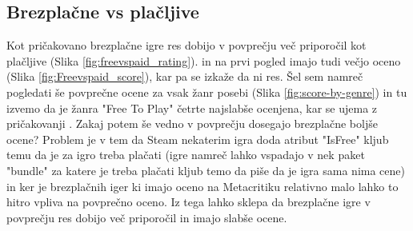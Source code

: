 \documentclass[a4paper]{article}
\begin{document}
\subsection{Brezplačne vs plačljive}
Kot pričakovano brezplačne igre res dobijo v povprečju več priporočil kot plačljive (Slika \ref{fig:freevspaid_rating}).
in na prvi pogled imajo tudi večjo oceno (Slika \ref{fig:Freevspaid_score}), kar pa se izkaže da ni res.
Šel sem namreč pogledati še povprečne ocene za vsak žanr posebi (Slika \ref{fig:score-by-genre})
in tu izvemo  da je žanra "Free To Play" četrte najslabše ocenjena, kar se ujema z pričakovanji . Zakaj potem še vedno v povprečju dosegajo brezplačne boljše ocene?
Problem je v tem da Steam nekaterim igra doda atribut "IsFree" kljub temu da je za igro treba plačati (igre namreč lahko vspadajo v nek paket "bundle" za katere je treba plačati kljub temo da piše da je igra sama nima cene) in ker je brezplačnih iger
ki imajo oceno na Metacritiku relativno malo lahko to hitro vpliva na povprečno oceno. Iz tega lahko sklepa da brezplačne igre v povprečju res dobijo več priporočil in imajo slabše ocene.
\end{document}
